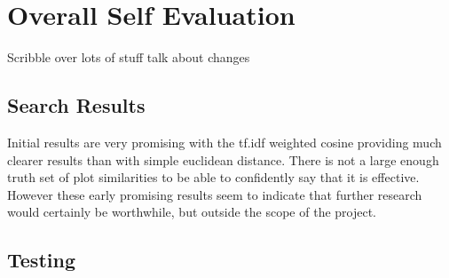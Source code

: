 \section{Overall Self Evaluation}
Scribble over lots of stuff talk about changes




\subsection{Search Results}
Initial results are very promising with the tf.idf weighted cosine providing much clearer results than with simple euclidean distance.  There is not a large enough truth set of plot similarities to be able to confidently say that it is effective.  However these early promising results seem to indicate that further research would certainly be worthwhile, but outside the scope of the project.

\subsection{Testing}
